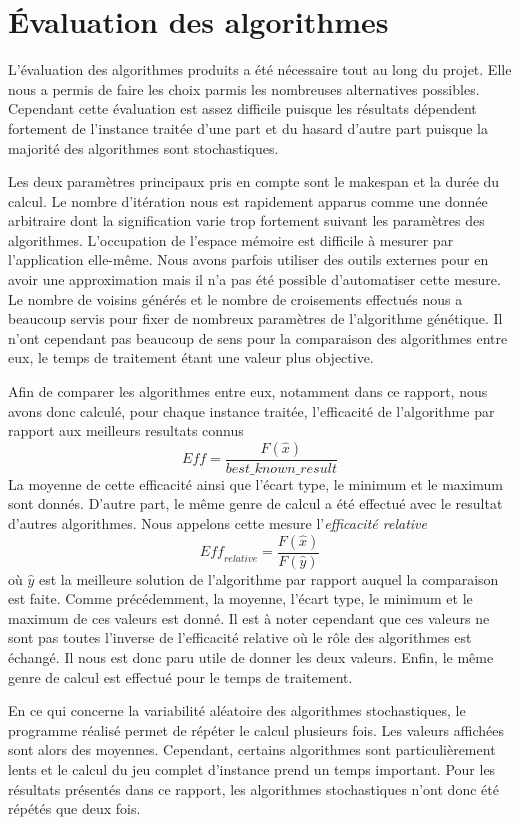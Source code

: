 \documentclass[french]{rapport}
\begin{document}
\section{Évaluation des algorithmes}

L'évaluation des algorithmes produits a été nécessaire tout au long du projet. Elle nous a permis de
faire les choix parmis les nombreuses alternatives possibles. Cependant cette évaluation est assez
difficile puisque les résultats dépendent fortement de l'instance traitée d'une part et du hasard
d'autre part puisque la majorité des algorithmes sont stochastiques.

Les deux paramètres principaux pris en compte sont le makespan et la durée du calcul. Le nombre
d'itération nous est rapidement apparus comme une donnée arbitraire dont la signification varie trop
fortement suivant les paramètres des algorithmes. L'occupation de l'espace mémoire est difficile à
mesurer par l'application elle-même. Nous avons parfois utiliser des outils externes pour en avoir
une approximation mais il n'a pas été possible d'automatiser cette mesure. Le nombre de voisins
générés et le nombre de croisements effectués nous a beaucoup servis pour fixer de nombreux paramètres de
l'algorithme génétique. Il n'ont cependant pas beaucoup de sens pour la comparaison des algorithmes
entre eux, le temps de traitement étant une valeur plus objective.

Afin de comparer les algorithmes entre eux, notamment dans ce rapport, nous avons donc calculé, pour
chaque instance traitée, l'efficacité de l'algorithme par rapport aux meilleurs resultats connus
$$
 \mathit{Eff} = \frac{F(\hat{x})}{\mathit{best\_known\_result}}
$$
La moyenne de cette efficacité ainsi que l'écart type, le minimum et le maximum sont donnés. D'autre
part, le même genre de calcul a été effectué avec le resultat d'autres algorithmes. Nous appelons
cette mesure l'\emph{efficacité relative}
$$
  \mathit{Eff_{relative}} = \frac{F(\hat{x})}{F(\hat{y})}
$$
où $\hat{y}$ est la meilleure solution de l'algorithme par rapport auquel la comparaison est faite.
Comme précédemment, la moyenne, l'écart type, le minimum et le maximum de ces valeurs est donné. Il
est à noter cependant que ces valeurs ne sont pas toutes l'inverse de l'efficacité relative où le
rôle des algorithmes est échangé. Il nous est donc paru utile de donner les deux valeurs. Enfin, le
même genre de calcul est effectué pour le temps de traitement.

En ce qui concerne la variabilité aléatoire des algorithmes stochastiques, le programme réalisé
permet de répéter le calcul plusieurs fois. Les valeurs affichées sont alors des
moyennes. Cependant, certains algorithmes sont particulièrement lents et le calcul du jeu complet
d'instance prend un temps important. Pour les résultats présentés dans ce rapport, les algorithmes
stochastiques n'ont donc été répétés que deux fois.
\end{document}
